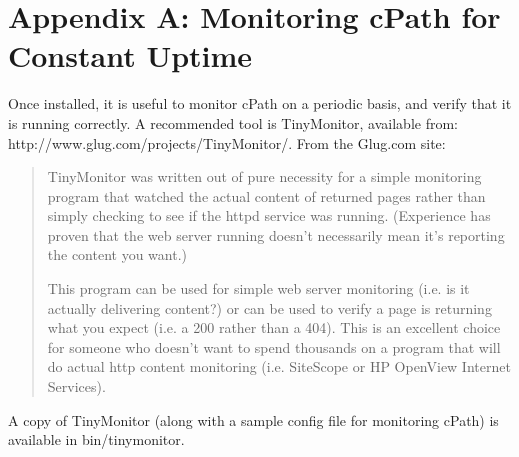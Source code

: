 \documentclass[letterpaper,12pt]{article}
\begin{document}
\section{Appendix A: Monitoring cPath for Constant Uptime}

Once installed, it is useful to monitor cPath on a periodic basis, and verify that it is running correctly. A recommended tool is TinyMonitor, available from: http://www.glug.com/projects/TinyMonitor/. From the Glug.com site:

\begin{quote}
TinyMonitor was written out of pure necessity for a simple monitoring program that watched the actual content of returned pages rather than simply checking to see if the httpd service was running. (Experience has proven that the web server running doesn't necessarily mean it's reporting the content you want.)

This program can be used for simple web server monitoring (i.e. is it actually delivering content?) or can be used to verify a page is returning what you expect (i.e. a 200 rather than a 404). This is an excellent choice for someone who doesn't want to spend thousands on a program that will do actual http content monitoring (i.e. SiteScope or HP OpenView Internet Services).
\end{quote}

A copy of TinyMonitor (along with a sample config file for monitoring cPath) is available in bin/tinymonitor.
\end{document}
